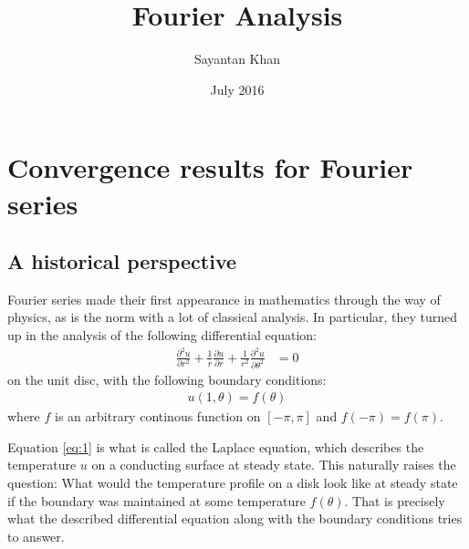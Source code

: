 \documentclass[12pt, titlepage]{article}
\title{Fourier Analysis}
\author{Sayantan Khan}
\date{July 2016}
\theoremstyle{definition}
\begin{document}
\tableofcontents

\newpage

\section{Convergence results for Fourier series}

\subsection{A historical perspective}
Fourier series made their first appearance in mathematics through the way of physics, as is the norm with a lot of classical analysis. In particular, they turned up in the analysis of the following differential equation:
\begin{align}
    \frac{\partial^2 u}{\partial r^2} + \frac{1}{r} \frac{\partial u}{\partial r} + \frac{1}{r^2} \frac{\partial^2 u}{\partial \theta^2} &= 0 \label{eq:1}
\end{align}
on the unit disc, with the following boundary conditions:
\begin{align*}
    u(1, \theta) = f(\theta)
\end{align*}
where $f$ is an arbitrary continous function on $[-\pi, \pi]$ and $f(-\pi) = f(\pi)$.

Equation \ref{eq:1} is what is called the Laplace equation, which describes the temperature $u$ on a conducting surface at steady state. This naturally raises the question: What would the temperature profile on a disk look like at steady state if the boundary was maintained at some temperature $f(\theta)$. That is precisely what the described differential equation along with the boundary conditions tries to answer.
\end{document}
